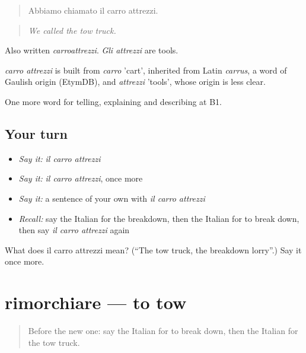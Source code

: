 \begin{quote}
Abbiamo chiamato il carro attrezzi.
\end{quote}

\begin{quote}
\emph{We called the tow truck.}
\end{quote}

Also written \emph{carroattrezzi}. \emph{Gli attrezzi} are tools.

\begin{cousinweb}
\emph{carro attrezzi} is built from \emph{carro} 'cart', inherited from Latin \emph{carrus}, a word of Gaulish origin (EtymDB), and \emph{attrezzi} 'tools', whose origin is less clear.
\end{cousinweb}

\begin{grammarlens}[title={What you've built}]
One more word for telling, explaining and describing at B1.
\end{grammarlens}

\subsection*{Your turn}
\begin{itemize}
\raggedright
  \item \emph{Say it:} \emph{il carro attrezzi}
  \item \emph{Say it:} \emph{il carro attrezzi}, once more
  \item \emph{Say it:} a sentence of your own with \emph{il carro attrezzi}
  \item \emph{Recall:} say the Italian for the breakdown, then the Italian for to break down, then say \emph{il carro attrezzi} again
\end{itemize}

\begin{tcolorbox}[breakable,colback=teal!4,colframe=teal!35!black,title={Before you move on}]
What does il carro attrezzi mean? (\textquotedblleft{}The tow truck, the breakdown lorry\textquotedblright{}.) Say it once more.
\end{tcolorbox}
\section[rimorchiare]{rimorchiare — to tow}

\label{lesson:IT-C410-rimorchiare}



\begin{quote}
Before the new one: say the Italian for to break down, then the Italian for the tow truck.
\end{quote}

